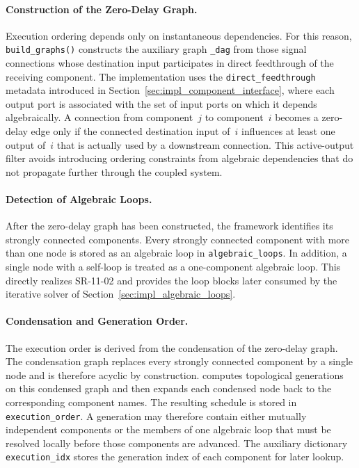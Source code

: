 \paragraph{Construction of the Zero-Delay Graph.}
Execution ordering depends only on instantaneous dependencies.
For this reason, \texttt{build\_graphs()} constructs the auxiliary graph \texttt{\_dag} from those signal connections whose destination input participates in direct feedthrough of the receiving component.
The implementation uses the \texttt{direct\_feedthrough} metadata introduced in Section~\ref{sec:impl_component_interface}, where each output port is associated with the set of input ports on which it depends algebraically.
A connection from component~$j$ to component~$i$ becomes a zero-delay edge only if the connected destination input of~$i$ influences at least one output of~$i$ that is actually used by a downstream connection.
This active-output filter avoids introducing ordering constraints from algebraic dependencies that do not propagate further through the coupled system.

\paragraph{Detection of Algebraic Loops.}
After the zero-delay graph has been constructed, the framework identifies its strongly connected components.
Every strongly connected component with more than one node is stored as an algebraic loop in \texttt{algebraic\_loops}.
In addition, a single node with a self-loop is treated as a one-component algebraic loop.
This directly realizes SR-11-02 and provides the loop blocks later consumed by the iterative solver of Section~\ref{sec:impl_algebraic_loops}.

\paragraph{Condensation and Generation Order.}
The execution order is derived from the condensation of the zero-delay graph.
The condensation graph replaces every strongly connected component by a single node and is therefore acyclic by construction.
\syssimx{} computes topological generations on this condensed graph and then expands each condensed node back to the corresponding component names.
The resulting schedule is stored in \texttt{execution\_order}.
A generation may therefore contain either mutually independent components or the members of one algebraic loop that must be resolved locally before those components are advanced.
The auxiliary dictionary \texttt{execution\_idx} stores the generation index of each component for later lookup.

